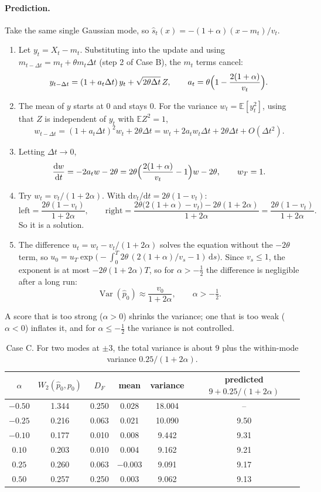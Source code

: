 \documentclass[11pt]{article}
\newcommand{\E}{\mathbb{E}}
\newcommand{\Var}{\operatorname{Var}}
\newcommand{\dd}{\mathrm{d}}
\begin{document}
\paragraph{Prediction.} Take the same single Gaussian mode, so $\hat s_t(x) = -(1+\alpha)(x-m_t)/v_t$.
\begin{enumerate}
\item Let $y_t = X_t - m_t$. Substituting into the update and using $m_{t-\Delta t} = m_t + \theta m_t\Delta t$ (step 2 of Case B), the
$m_t$ terms cancel:
\[
y_{t-\Delta t} = (1 + a_t\Delta t)\,y_t + \sqrt{2\theta\Delta t}\,Z, \qquad a_t = \theta\Bigl(1-\frac{2(1+\alpha)}{v_t}\Bigr).
\]
\item The mean of $y$ starts at $0$ and stays $0$. For the variance $w_t = \E[y_t^2]$, using that $Z$ is independent of $y_t$ with $\E Z^2=1$,
\[
w_{t-\Delta t} = (1+a_t\Delta t)^2 w_t + 2\theta\Delta t = w_t + 2a_tw_t\Delta t + 2\theta\Delta t + O(\Delta t^2).
\]
\item Letting $\Delta t\to0$,
\[
\frac{\dd w}{\dd t} = -2a_tw - 2\theta = 2\theta\Bigl(\frac{2(1+\alpha)}{v_t}-1\Bigr)w - 2\theta, \qquad w_T = 1 .
\]
\item Try $w_t = v_t/(1+2\alpha)$. With $\dd v_t/\dd t = 2\theta(1-v_t)$:
\[
\text{left} = \frac{2\theta(1-v_t)}{1+2\alpha}, \qquad
\text{right} = \frac{2\theta\bigl(2(1+\alpha)-v_t\bigr) - 2\theta(1+2\alpha)}{1+2\alpha} = \frac{2\theta(1-v_t)}{1+2\alpha} .
\]
So it is a solution.
\item The difference $u_t = w_t - v_t/(1+2\alpha)$ solves the equation without the $-2\theta$ term, so
$u_0 = u_T\exp\bigl(-\int_0^T 2\theta\,(2(1+\alpha)/v_s-1)\,\dd s\bigr)$. Since $v_s\le1$, the exponent is at most $-2\theta(1+2\alpha)T$, so for $\alpha>-\tfrac12$
the difference is negligible after a long run:
\[
\boxed{\Var(\hat p_0) \approx \frac{v_0}{1+2\alpha}, \qquad \alpha>-\tfrac12 .}
\]
\end{enumerate}
A score that is too strong ($\alpha>0$) shrinks the variance; one that is too weak ($\alpha<0$) inflates it, and for $\alpha\le-\tfrac12$ the
variance is not controlled.

\begin{table}[H]
\centering
\begin{tabular}{cccccc}
\hline
$\alpha$ & $W_2(\hat p_0,p_0)$ & $D_F$ & mean & variance & predicted $9+0.25/(1+2\alpha)$ \\
\hline
$-0.50$ & 1.344 & 0.250 & 0.028 & 18.004 & -- \\
$-0.25$ & 0.216 & 0.063 & 0.021 & 10.090 & 9.50 \\
$-0.10$ & 0.177 & 0.010 & 0.008 & 9.442 & 9.31 \\
$0.10$ & 0.203 & 0.010 & 0.004 & 9.162 & 9.21 \\
$0.25$ & 0.260 & 0.063 & $-0.003$ & 9.091 & 9.17 \\
$0.50$ & 0.257 & 0.250 & 0.003 & 9.062 & 9.13 \\
\hline
\end{tabular}
\caption{Case C. For two modes at $\pm3$, the total variance is about $9$ plus the within-mode variance $0.25/(1+2\alpha)$.}
\label{tab:caseC}
\end{table}
\end{document}

